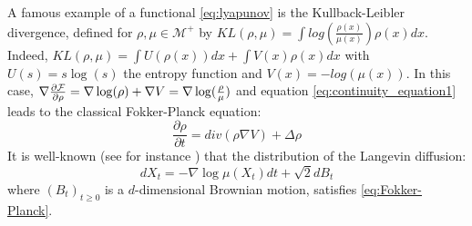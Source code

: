 \begin{remark} \label{rem:KL_Lyapunov}
	A famous example of a functional \eqref{eq:lyapunov} is the Kullback-Leibler divergence, defined for $\rho, \mu \in \mathcal{M}^+$ by
	$KL(\rho,\mu)=\int log(\frac{\rho(x)}{\mu(x)})\rho(x)dx$. Indeed, $KL(\rho, \mu)=\int U(\rho(x))dx + \int V(x) \rho(x)dx$ with $U(s)=s\log(s)$ the entropy function and $V(x)=-log(\mu(x))$. In this case, $\nabla \frac{\partial {{\mathcal F}}}{\partial \rho}= \nabla \log(\rho) + \nabla V=  \nabla \log(\frac{\rho}{\mu})$ and equation \eqref{eq:continuity_equation1} leads to the classical Fokker-Planck equation:
	\begin{equation}\label{eq:Fokker-Planck}
	\frac{\partial{\rho}}{\partial t}= div(\rho \nabla V )+ \Delta \rho
	\end{equation}
It is well-known (see for instance \cite{jordan1998variational}) that the distribution of the Langevin diffusion:
	\begin{equation}\label{eq:langevin_diffusion}
	dX_t= -\nabla \log \mu (X_t)dt+\sqrt{2}dB_t
	\end{equation}
	where $(B_t)_{t\ge0}$ is a $d$-dimensional Brownian motion, satisfies \eqref{eq:Fokker-Planck}.
\end{remark}




